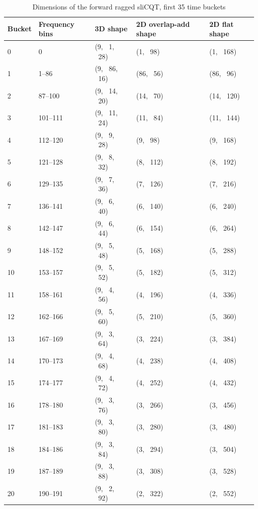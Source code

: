 \documentclass[report.tex]{subfiles}
\begin{document}
\begin{table}[ht]
	\centering
	\caption{Dimensions of the forward ragged sliCQT, first 35 time buckets}
	\label{table:slicqdim1}
	\begin{tabular}{ |l|l|l|l|l| }
	 \hline
		Bucket & Frequency bins & 3D shape & 2D overlap-add shape & 2D flat shape \\
	 \hline
	 \hline
0 & 0 & (9, \ 1, \ 28) & (1, \ 98) & (1, \ 168) \\
\hline
1 & 1--86 & (9, \ 86, \ 16) & (86, \ 56) & (86, \ 96) \\
\hline
2 & 87--100 & (9, \ 14, \ 20) & (14, \ 70) & (14, \ 120) \\
\hline
3 & 101--111 & (9, \ 11, \ 24) & (11, \ 84) & (11, \ 144) \\
\hline
4 & 112--120 & (9, \ 9, \ 28) & (9, \ 98) & (9, \ 168) \\
\hline
5 & 121--128 & (9, \ 8, \ 32) & (8, \ 112) & (8, \ 192) \\
\hline
6 & 129--135 & (9, \ 7, \ 36) & (7, \ 126) & (7, \ 216) \\
\hline
7 & 136--141 & (9, \ 6, \ 40) & (6, \ 140) & (6, \ 240) \\
\hline
8 & 142--147 & (9, \ 6, \ 44) & (6, \ 154) & (6, \ 264) \\
\hline
9 & 148--152 & (9, \ 5, \ 48) & (5, \ 168) & (5, \ 288) \\
\hline
10 & 153--157 & (9, \ 5, \ 52) & (5, \ 182) & (5, \ 312) \\
\hline
11 & 158--161 & (9, \ 4, \ 56) & (4, \ 196) & (4, \ 336) \\
\hline
12 & 162--166 & (9, \ 5, \ 60) & (5, \ 210) & (5, \ 360) \\
\hline
13 & 167--169 & (9, \ 3, \ 64) & (3, \ 224) & (3, \ 384) \\
\hline
14 & 170--173 & (9, \ 4, \ 68) & (4, \ 238) & (4, \ 408) \\
\hline
15 & 174--177 & (9, \ 4, \ 72) & (4, \ 252) & (4, \ 432) \\
\hline
16 & 178--180 & (9, \ 3, \ 76) & (3, \ 266) & (3, \ 456) \\
\hline
17 & 181--183 & (9, \ 3, \ 80) & (3, \ 280) & (3, \ 480) \\
\hline
18 & 184--186 & (9, \ 3, \ 84) & (3, \ 294) & (3, \ 504) \\
\hline
19 & 187--189 & (9, \ 3, \ 88) & (3, \ 308) & (3, \ 528) \\
\hline
20 & 190--191 & (9, \ 2, \ 92) & (2, \ 322) & (2, \ 552) \\

\end{tabular}
\end{table}
\end{document}
